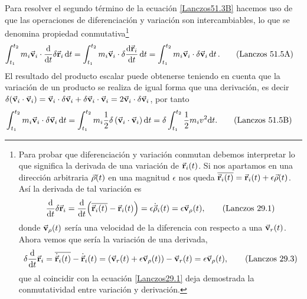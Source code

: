 \documentclass[12pt, spanish, a4paper, ]{article}
\begin{document}
Para resolver el segundo término de la ecuación \eqref{Lanczos51.3B} hacemos uso de que las operaciones de diferenciación y variación son intercambiables, lo que se denomina propiedad conmutativa\footnote{
Para probar que diferenciación y variación conmutan debemos interpretar lo que significa la derivada de una variación de \(\va{r}_i (t)\).
Si nos apartamos en una dirección arbitraria \(\va{\rho} (t)\) en una magnitud \(\epsilon\) nos queda \(\overline{\va{r}_i (t)}= \va{r}_i (t)+ \epsilon \va{\rho} (t)\).
Así la derivada de tal variación es
\begin{equation}\label{Lanczos29.1}
	\dv{t} \delta \va{r}_i= \dv{t}\pqty{\overline{\va{r}_i (t)}- \va{r}_i (t)}= \epsilon \dot{\va{\rho}}_i (t)= \epsilon \va{v}_\rho (t),
	\tag{Lanczos 29.1}
\end{equation}
donde \(\va{v}_\rho (t) \) sería una velocidad de la diferencia con respecto a una \(\va{v}_r (t) \).
Ahora vemos que sería la variación de una derivada,
\begin{equation}\label{Lanczos29.3}
	\delta \dv{t} \va{r}_i= \overline{\dot{\va{r}}_i (t)} - \dot{\va{r}}_i (t)= \pqty{\va{v}_r (t) + \epsilon \va{v}_\rho (t)}- \va{v}_r (t) = \epsilon \va{v}_\rho (t),
	\tag{Lanczos 29.3}
\end{equation}
que al coincidir con la ecuación \eqref{Lanczos29.1} deja demostrada la conmutatividad entre variación y derivación.
}
\begin{align}\label{Lanczos51.5A}
	\int^{t_2}_{t_1} m_i \va{v}_i \cdot \dv{t} \delta \va{r}_i \dd{t} & =
	\int^{t_2}_{t_1} m_i \va{v}_i \cdot \delta \dv{\va{r}_i}{t} \dd{t} =
	\int^{t_2}_{t_1} m_i \va{v}_i \cdot \delta \va{v}_i \dd{t}. 
	\tag{Lanczos 51.5A}
\end{align}
El resultado del producto escalar puede obtenerse teniendo en cuenta que la variación de un producto se realiza de igual forma que una derivación, es decir \(\delta(\va{v}_i \cdot \va{v}_i)= \va{v}_i \cdot \delta \va{v}_i +\delta \va{v}_i \cdot \va{v}_i= 2 \va{v}_i \cdot \delta \va{v}_i\), por tanto
\begin{align}\label{Lanczos51.5B}
	\int^{t_2}_{t_1} m_i \va{v}_i \cdot \delta \va{v}_i \dd{t} & =
	\int^{t_2}_{t_1} m_i \frac{1}{2} \delta \left( \va{v}_i \cdot \va{v}_i \right) \dd{t} = 
	\delta \int^{t_2}_{t_1} \frac{1}{2} m_i v^2 \dd t.
	\tag{Lanczos 51.5B}
\end{align}
\end{document}

